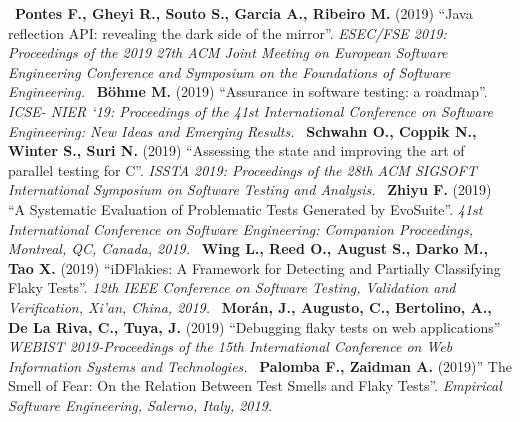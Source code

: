 \newline~\newline
[S24] \textbf{Pontes F., Gheyi R., Souto S., Garcia A., Ribeiro M.} (2019) “Java reflection API: revealing the dark side of the mirror”. \emph{ESEC/FSE 2019: Proceedings of the 2019 27th ACM Joint Meeting on European Software Engineering Conference and Symposium on the Foundations of Software Engineering.}
\newline~\newline
[S25] \textbf{Böhme M.} (2019) “Assurance in software testing: a roadmap”. \emph{ICSE- NIER ‘19: Proceedings of the 41st International Conference on Software Engineering: New Ideas and Emerging Results.}
\newline~\newline
[S26] \textbf{Schwahn O., Coppik N., Winter S., Suri N.} (2019) “Assessing the state and improving the art of parallel testing for C”. \emph{ISSTA 2019: Proceedings of the 28th ACM SIGSOFT International Symposium on Software Testing and Analysis.}
\newline~\newline
[S27] \textbf{Zhiyu F.} (2019) “A Systematic Evaluation of Problematic Tests Generated by EvoSuite”. \emph{41st International Conference on Software Engineering: Companion Proceedings, Montreal, QC, Canada, 2019.}
\newline~\newline
[S28] \textbf{Wing L., Reed O., August S., Darko M., Tao X.} (2019) “iDFlakies: A Framework for Detecting and Partially Classifying Flaky Tests”. \emph{12th IEEE Conference on Software Testing, Validation and Verification, Xi’an, China, 2019.}
\newline~\newline
[S29] \textbf{Morán, J., Augusto, C., Bertolino, A., De La Riva, C., Tuya, J.}
(2019) “Debugging flaky tests on web applications” \emph{WEBIST 2019-Proceedings of the 15th International Conference on Web Information Systems and Technologies.}
\newline~\newline
[S30] \textbf{Palomba F., Zaidman A.} (2019)” The Smell of Fear: On the Relation Between Test Smells and Flaky Tests”. \emph{Empirical Software Engineering, Salerno, Italy, 2019.}
